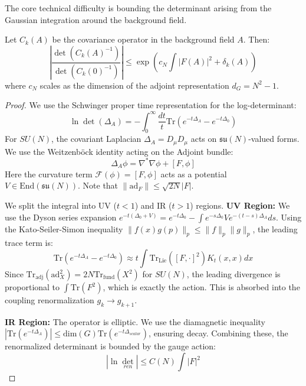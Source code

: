 The core technical difficulty is bounding the determinant arising from the Gaussian integration around the background field.

\begin{lemma}
Let $C_k(A)$ be the covariance operator in the background field $A$. Then:
\begin{equation}
\left| \frac{\det(C_k(A)^{-1})}{\det(C_k(0)^{-1})} \right| \le \exp\left( c_N \int |F(A)|^2 + \delta_k(A) \right)
\end{equation}
where $c_N$ scales as the dimension of the adjoint representation $d_G = N^2-1$.
\end{lemma}

\begin{proof}
We use the Schwinger proper time representation for the log-determinant:
\begin{equation}
\ln \det (\Delta_A) = -\int_{0}^{\infty} \frac{dt}{t} \text{Tr}\left(e^{-t \Delta_A} - e^{-t \Delta_0}\right)
\end{equation}
For $SU(N)$, the covariant Laplacian $\Delta_A = D_\mu D_\mu$ acts on $\mathfrak{su}(N)$-valued forms.
We use the Weitzenb\"ock identity acting on the Adjoint bundle:
\begin{equation}
\Delta_A \phi = \nabla^* \nabla \phi + [F, \phi]
\end{equation}
Here the curvature term $\mathcal{F}(\phi) = [F, \phi]$ acts as a potential $V \in \text{End}(\mathfrak{su}(N))$. Note that $\| \text{ad}_F \| \le \sqrt{2N} |F|$.

We split the integral into UV ($t < 1$) and IR ($t > 1$) regions.
\textbf{UV Region:} We use the Dyson series expansion $e^{-t(\Delta_0 + V)} = e^{-t\Delta_0} - \int e^{-s\Delta_0} V e^{-(t-s)\Delta_A} ds$.
Using the Kato-Seiler-Simon inequality $\|f(x) g(p)\|_p \le \|f\|_p \|g\|_p$, the leading trace term is:
\begin{equation}
\text{Tr}(e^{-t\Delta_A} - e^{-t\Delta_0}) \approx t \int \text{Tr}_{\text{Lie}}( [F, \cdot]^2 ) K_t(x,x) dx
\end{equation}
Since $\text{Tr}_{\text{adj}}(\text{ad}_X^2) = 2N \text{Tr}_{\text{fund}}(X^2)$ for $SU(N)$, the leading divergence is proportional to $\int \text{Tr}(F^2)$, which is exactly the action. This is absorbed into the coupling renormalization $g_k \to g_{k+1}$.

\textbf{IR Region:} The operator is elliptic. We use the diamagnetic inequality $|\text{Tr}(e^{-t\Delta_A})| \le \text{dim}(G) \text{Tr}(e^{-t\Delta_{scalar}})$, ensuring decay.
Combining these, the renormalized determinant is bounded by the gauge action:
\begin{equation}
|\ln \det_{ren}| \le C(N) \int |F|^2
\end{equation}
\end{proof}

